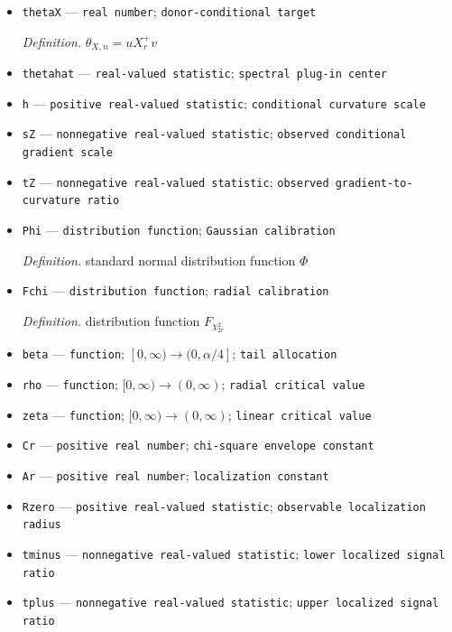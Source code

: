 \documentclass{article}
\begin{document}
\begin{itemize}
  \item \texttt{thetaX} --- \texttt{real number}; \texttt{donor-\allowbreak{}conditional target}
  \par\smallskip\noindent\emph{Definition.} \(\theta_{X,n}=uX_r^+v\)
  \item \texttt{thetahat} --- \texttt{real-\allowbreak{}valued statistic}; \texttt{spectral plug-\allowbreak{}in center}
  \item \texttt{h} --- \texttt{positive real-\allowbreak{}valued statistic}; \texttt{conditional curvature scale}
  \item \texttt{sZ} --- \texttt{nonnegative real-\allowbreak{}valued statistic}; \texttt{observed conditional gradient scale}
  \item \texttt{tZ} --- \texttt{nonnegative real-\allowbreak{}valued statistic}; \texttt{observed gradient-\allowbreak{}to-\allowbreak{}curvature ratio}
  \item \texttt{Phi} --- \texttt{distribution function}; \texttt{Gaussian calibration}
  \par\smallskip\noindent\emph{Definition.} standard normal distribution function \(\Phi\)
  \item \texttt{Fchi} --- \texttt{distribution function}; \texttt{radial calibration}
  \par\smallskip\noindent\emph{Definition.} distribution function \(F_{\chi^2_{2r}}\)
  \item \texttt{beta} --- \texttt{function}; \([0,\infty)\to(0,\alpha/4]\); \texttt{tail allocation}
  \item \texttt{rho} --- \texttt{function}; \([0,\infty)\to(0,\infty)\); \texttt{radial critical value}
  \item \texttt{zeta} --- \texttt{function}; \([0,\infty)\to(0,\infty)\); \texttt{linear critical value}
  \item \texttt{Cr} --- \texttt{positive real number}; \texttt{chi-\allowbreak{}square envelope constant}
  \item \texttt{Ar} --- \texttt{positive real number}; \texttt{localization constant}
  \item \texttt{Rzero} --- \texttt{positive real-\allowbreak{}valued statistic}; \texttt{observable localization radius}
  \item \texttt{tminus} --- \texttt{nonnegative real-\allowbreak{}valued statistic}; \texttt{lower localized signal ratio}
  \item \texttt{tplus} --- \texttt{nonnegative real-\allowbreak{}valued statistic}; \texttt{upper localized signal ratio}

\end{itemize}
\end{document}
